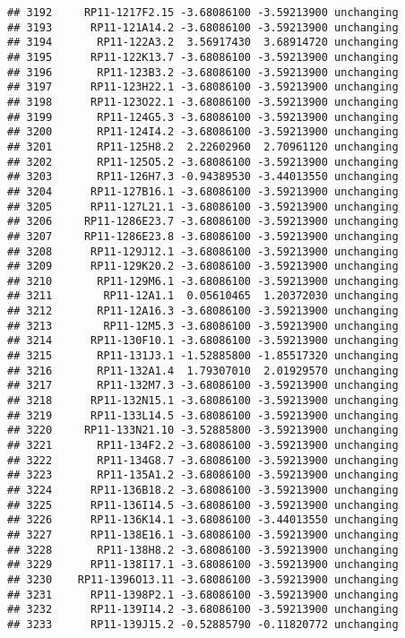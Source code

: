 \documentclass[]{article}
\begin{document}
\begin{verbatim}
## 3192     RP11-1217F2.15 -3.68086100 -3.59213900 unchanging
## 3193      RP11-121A14.2 -3.68086100 -3.59213900 unchanging
## 3194       RP11-122A3.2  3.56917430  3.68914720 unchanging
## 3195      RP11-122K13.7 -3.68086100 -3.59213900 unchanging
## 3196       RP11-123B3.2 -3.68086100 -3.59213900 unchanging
## 3197      RP11-123H22.1 -3.68086100 -3.59213900 unchanging
## 3198      RP11-123O22.1 -3.68086100 -3.59213900 unchanging
## 3199       RP11-124G5.3 -3.68086100 -3.59213900 unchanging
## 3200       RP11-124I4.2 -3.68086100 -3.59213900 unchanging
## 3201       RP11-125H8.2  2.22602960  2.70961120 unchanging
## 3202       RP11-125O5.2 -3.68086100 -3.59213900 unchanging
## 3203       RP11-126H7.3 -0.94389530 -3.44013550 unchanging
## 3204      RP11-127B16.1 -3.68086100 -3.59213900 unchanging
## 3205      RP11-127L21.1 -3.68086100 -3.59213900 unchanging
## 3206     RP11-1286E23.7 -3.68086100 -3.59213900 unchanging
## 3207     RP11-1286E23.8 -3.68086100 -3.59213900 unchanging
## 3208      RP11-129J12.1 -3.68086100 -3.59213900 unchanging
## 3209      RP11-129K20.2 -3.68086100 -3.59213900 unchanging
## 3210       RP11-129M6.1 -3.68086100 -3.59213900 unchanging
## 3211        RP11-12A1.1  0.05610465  1.20372030 unchanging
## 3212       RP11-12A16.3 -3.68086100 -3.59213900 unchanging
## 3213        RP11-12M5.3 -3.68086100 -3.59213900 unchanging
## 3214      RP11-130F10.1 -3.68086100 -3.59213900 unchanging
## 3215       RP11-131J3.1 -1.52885800 -1.85517320 unchanging
## 3216       RP11-132A1.4  1.79307010  2.01929570 unchanging
## 3217       RP11-132M7.3 -3.68086100 -3.59213900 unchanging
## 3218      RP11-132N15.1 -3.68086100 -3.59213900 unchanging
## 3219      RP11-133L14.5 -3.68086100 -3.59213900 unchanging
## 3220     RP11-133N21.10 -3.52885800 -3.59213900 unchanging
## 3221       RP11-134F2.2 -3.68086100 -3.59213900 unchanging
## 3222       RP11-134G8.7 -3.68086100 -3.59213900 unchanging
## 3223       RP11-135A1.2 -3.68086100 -3.59213900 unchanging
## 3224      RP11-136B18.2 -3.68086100 -3.59213900 unchanging
## 3225      RP11-136I14.5 -3.68086100 -3.59213900 unchanging
## 3226      RP11-136K14.1 -3.68086100 -3.44013550 unchanging
## 3227      RP11-138E16.1 -3.68086100 -3.59213900 unchanging
## 3228       RP11-138H8.2 -3.68086100 -3.59213900 unchanging
## 3229      RP11-138I17.1 -3.68086100 -3.59213900 unchanging
## 3230    RP11-1396O13.11 -3.68086100 -3.59213900 unchanging
## 3231      RP11-1398P2.1 -3.68086100 -3.59213900 unchanging
## 3232      RP11-139I14.2 -3.68086100 -3.59213900 unchanging
## 3233      RP11-139J15.2 -0.52885790 -0.11820772 unchanging

\end{verbatim}
\end{document}
